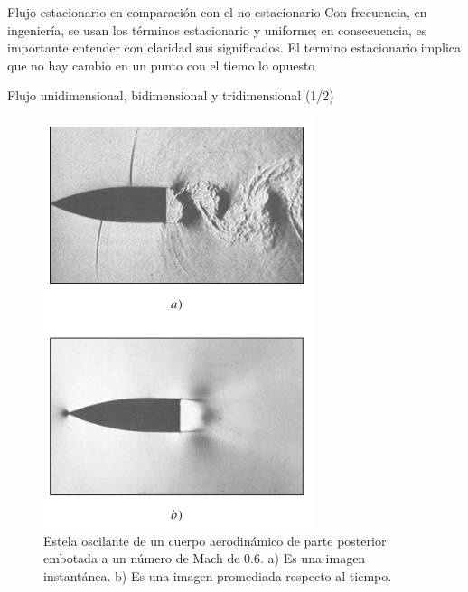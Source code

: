 \begin{frame}{Flujo estacionario en comparación con el no-estacionario}
\justifying
Con frecuencia, en ingeniería, se usan los términos estacionario y uniforme; en consecuencia, es importante entender con claridad sus significados. El termino estacionario implica que no hay cambio en un punto con el tiemo lo opuesto
\end{frame}
	
\begin{frame}{Flujo unidimensional, bidimensional y tridimensional (1/2)}
\justifying
\begin{figure}[H]
\centering
\includegraphics[scale=0.25]{Section_Files/imagenes/sec01_0101_Fig01-22.png}
\caption{Estela oscilante de un cuerpo aerodinámico de parte posterior embotada a un número de Mach de 0.6. a) Es una imagen instantánea. b) Es una imagen promediada respecto al tiempo.}
\label{fig: Figura1-22}
\end{figure}
\end{frame}
	
